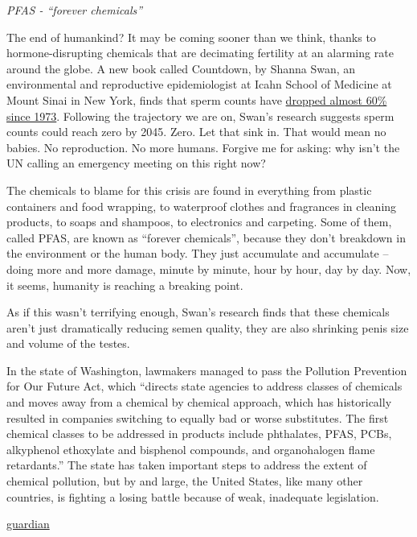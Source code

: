 \documentclass[
]{book}
\begin{document}
\emph{PFAS - ``forever chemicals''}

The end of humankind? It may be coming sooner than we think, thanks to hormone-disrupting chemicals that are decimating fertility at an alarming rate around the globe. A new book called Countdown, by Shanna Swan, an environmental and reproductive epidemiologist at Icahn School of Medicine at Mount Sinai in New York, finds that sperm counts have \href{https://www.theguardian.com/us-news/2021/feb/26/falling-sperm-counts-human-survival}{dropped almost 60\% since 1973}. Following the trajectory we are on, Swan's research suggests sperm counts could reach zero by 2045. Zero. Let that sink in. That would mean no babies. No reproduction. No more humans. Forgive me for asking: why isn't the UN calling an emergency meeting on this right now?

The chemicals to blame for this crisis are found in everything from plastic containers and food wrapping, to waterproof clothes and fragrances in cleaning products, to soaps and shampoos, to electronics and carpeting. Some of them, called PFAS, are known as ``forever chemicals'', because they don't breakdown in the environment or the human body. They just accumulate and accumulate -- doing more and more damage, minute by minute, hour by hour, day by day. Now, it seems, humanity is reaching a breaking point.

As if this wasn't terrifying enough, Swan's research finds that these chemicals aren't just dramatically reducing semen quality, they are also shrinking penis size and volume of the testes.

In the state of Washington, lawmakers managed to pass the Pollution Prevention for Our Future Act, which ``directs state agencies to address classes of chemicals and moves away from a chemical by chemical approach, which has historically resulted in companies switching to equally bad or worse substitutes. The first chemical classes to be addressed in products include phthalates, PFAS, PCBs, alkyphenol ethoxylate and bisphenol compounds, and organohalogen flame retardants.'' The state has taken important steps to address the extent of chemical pollution, but by and large, the United States, like many other countries, is fighting a losing battle because of weak, inadequate legislation.

\href{https://www.theguardian.com/commentisfree/2021/mar/18/toxic-chemicals-health-humanity-erin-brokovich}{guardian}
\end{document}
